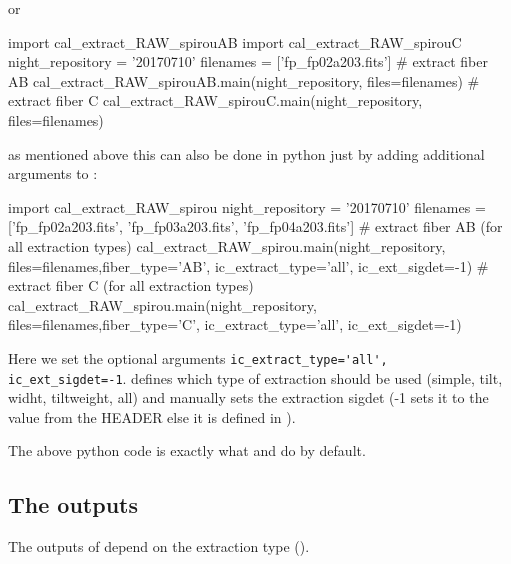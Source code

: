 \noindent or
\begin{pythonbox}
import cal_extract_RAW_spirouAB
import cal_extract_RAW_spirouC
night_repository = '20170710'
filenames = ['fp_fp02a203.fits']
# extract fiber AB
cal_extract_RAW_spirouAB.main(night_repository, files=filenames)
# extract fiber C
cal_extract_RAW_spirouC.main(night_repository, files=filenames)
\end{pythonbox}
\noindent as mentioned above this can also be done in python just by adding additional arguments to \calextractRAW:
\begin{pythonbox}
import cal_extract_RAW_spirou
night_repository = '20170710'
filenames = ['fp_fp02a203.fits', 'fp_fp03a203.fits', 'fp_fp04a203.fits']
# extract fiber AB (for all extraction types)
cal_extract_RAW_spirou.main(night_repository, files=filenames,fiber_type='AB',
                            ic_extract_type='all', ic_ext_sigdet=-1)
# extract fiber C (for all extraction types)
cal_extract_RAW_spirou.main(night_repository, files=filenames,fiber_type='C',
                            ic_extract_type='all', ic_ext_sigdet=-1)
\end{pythonbox}
\begin{note}
Here we set the optional arguments \lstinline[style=pythoninline]|ic_extract_type='all', ic_ext_sigdet=-1|.  defines which type of extraction should be used (simple, tilt, widht, tiltweight, all) and  manually sets the extraction sigdet (-1 sets it to the value from the HEADER else it is defined in \constantsfile).
\end{note}
\noindent The above python code is exactly what \calextractRAWAB and \calextractRAWC do by default.


\subsection{The outputs}
The outputs of \calextractRAW depend on the extraction type (). 


